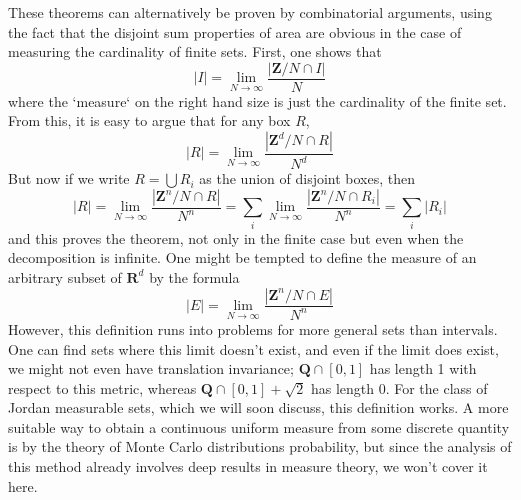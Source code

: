 \begin{remark}
These theorems can alternatively be proven by combinatorial arguments, using the fact that the disjoint sum properties of area are obvious in the case of measuring the cardinality of finite sets. First, one shows that
%
\[ |I| = \lim_{N \to \infty} \frac{|\mathbf{Z}/N \cap I|}{N} \]
%
where the `measure` on the right hand size is just the cardinality of the finite set. From this, it is easy to argue that for any box $R$,
%
\[ |R| = \lim_{N \to \infty} \frac{|\mathbf{Z}^d/N \cap R|}{N^d} \]
%
But now if we write $R = \bigcup R_i$ as the union of disjoint boxes, then
%
\[ |R| = \lim_{N \to \infty} \frac{|\mathbf{Z}^n/N \cap R|}{N^n} = \sum_i \lim_{N \to \infty} \frac{|\mathbf{Z}^n/N \cap R_i|}{N^n} = \sum_i |R_i| \]
%
and this proves the theorem, not only in the finite case but even when the decomposition is infinite. One might be tempted to define the measure of an arbitrary subset of $\mathbf{R}^d$ by the formula
%
\[ |E| = \lim_{N \to \infty} \frac{|\mathbf{Z}^n/N \cap E|}{N^n} \]
%
However, this definition runs into problems for more general sets than intervals. One can find sets where this limit doesn't exist, and even if the limit does exist, we might not even have translation invariance; $\mathbf{Q} \cap [0,1]$ has length 1 with respect to this metric, whereas $\mathbf{Q} \cap [0,1] + \sqrt{2}$ has length 0. For the class of Jordan measurable sets, which we will soon discuss, this definition works. A more suitable way to obtain a continuous uniform measure from some discrete quantity is by the theory of Monte Carlo distributions probability, but since the analysis of this method already involves deep results in measure theory, we won't cover it here.
\end{remark}

%
%
%
%
%
%
%
%
%
%
%

